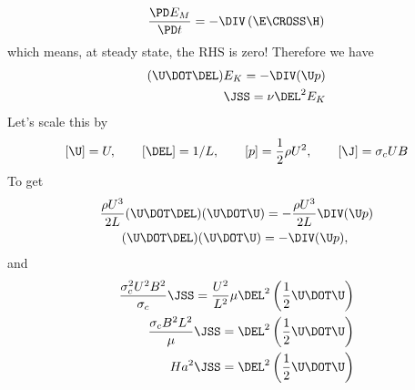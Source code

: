 \documentclass[11pt]{article}
\begin{document}
\begin{equation}
	\frac{\PD E_M}{\PD t} =	- \DIV \left(\E \CROSS \H \right)
\end{equation}
which means, at steady state, the RHS is zero! Therefore we have
\begin{equation}\begin{aligned}
	(\U \DOT \DEL) E_K = - \DIV (\U p) \\
	\JSS = \nu \DEL^2 E_K
\end{aligned}\end{equation}
Let's scale this by
\begin{equation}\begin{aligned}
	[\U] = U, \qquad
	[\DEL] = 1/L, \qquad
	[p] = \frac{1}{2} \rho U^2, \qquad
	[\J] = \sigma_c U B
\end{aligned}\end{equation}
To get
\begin{equation}\begin{aligned}
	\frac{\rho U^3}{2L} (\U \DOT \DEL) ( \U \DOT \U ) =
	- \frac{\rho U^3}{2L} \DIV (\U p) \\
	(\U \DOT \DEL) ( \U \DOT \U ) =
	- \DIV (\U p), \qquad
\end{aligned}\end{equation}
and
\begin{equation}\begin{aligned}
	\frac{\sigma_c^2 U^2 B^2}{\sigma_c} \JSS =
	\frac{U^2}{L^2} \mu \DEL^2 \left( \frac{1}{2} \U \DOT \U \right) \\
	\frac{\sigma_c B^2 L^2}{\mu} \JSS =
	\DEL^2 \left( \frac{1}{2} \U \DOT \U \right) \\
	Ha^2 \JSS =
	\DEL^2 \left( \frac{1}{2} \U \DOT \U \right)
\end{aligned}\end{equation}

\end{document}
